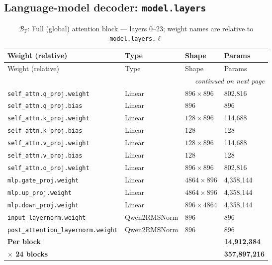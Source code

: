 \documentclass[10pt,a4paper]{article}
\theoremstyle{definition}
\begin{document}
\subsection{Language-model decoder: \texttt{model.layers}}
\begin{longtable}{p{6.6cm}>{\raggedright\arraybackslash}p{3.6cm}ll}
\caption{$\mathcal{B}_{\mathrm{F}}$: Full (global) attention block --- layers 0--23; weight names are relative to \texttt{model.layers.$\ell$}}\\
\toprule
Weight (relative) & Type & Shape & Params \\
\midrule
\endfirsthead
\toprule
Weight (relative) & Type & Shape & Params \\
\midrule
\endhead
\midrule \multicolumn{4}{r}{\textit{continued on next page}} \\
\endfoot
\bottomrule
\endlastfoot
\texttt{self\_attn.\allowbreak{}q\_proj.\allowbreak{}weight} & Linear & $896 \times 896$ & 802,816 \\
\texttt{self\_attn.\allowbreak{}q\_proj.\allowbreak{}bias} & Linear & $896$ & 896 \\
\texttt{self\_attn.\allowbreak{}k\_proj.\allowbreak{}weight} & Linear & $128 \times 896$ & 114,688 \\
\texttt{self\_attn.\allowbreak{}k\_proj.\allowbreak{}bias} & Linear & $128$ & 128 \\
\texttt{self\_attn.\allowbreak{}v\_proj.\allowbreak{}weight} & Linear & $128 \times 896$ & 114,688 \\
\texttt{self\_attn.\allowbreak{}v\_proj.\allowbreak{}bias} & Linear & $128$ & 128 \\
\texttt{self\_attn.\allowbreak{}o\_proj.\allowbreak{}weight} & Linear & $896 \times 896$ & 802,816 \\
\texttt{mlp.\allowbreak{}gate\_proj.\allowbreak{}weight} & Linear & $4864 \times 896$ & 4,358,144 \\
\texttt{mlp.\allowbreak{}up\_proj.\allowbreak{}weight} & Linear & $4864 \times 896$ & 4,358,144 \\
\texttt{mlp.\allowbreak{}down\_proj.\allowbreak{}weight} & Linear & $896 \times 4864$ & 4,358,144 \\
\texttt{input\_layernorm.\allowbreak{}weight} & Qwen2\allowbreak{}RMSNorm & $896$ & 896 \\
\texttt{post\_attention\_layernorm.\allowbreak{}weight} & Qwen2\allowbreak{}RMSNorm & $896$ & 896 \\
\midrule \textbf{Per block} & & & \textbf{14,912,384} \\
\textbf{$\times$ 24 blocks} & & & \textbf{357,897,216} \\
\end{longtable}
\end{document}
